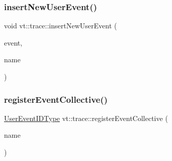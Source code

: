 \mbox{\label{namespacevt_1_1trace_ad8215db5be893bda922be84a8bc586e2}} 
\subsubsection{\texorpdfstring{insert\+New\+User\+Event()}{insertNewUserEvent()}\hspace{0.1cm}{\footnotesize\ttfamily [2/2]}}
{\footnotesize\ttfamily void vt\+::trace\+::insert\+New\+User\+Event (\begin{DoxyParamCaption}\item[{\mbox{[}\mbox{[}maybe\+\_\+unused\mbox{]} \mbox{]} \hyperlink{namespacevt_1_1trace_a5908920d051c144c89f17c69ed262350}{User\+Event\+I\+D\+Type}}]{event,  }\item[{\mbox{[}\mbox{[}maybe\+\_\+unused\mbox{]} \mbox{]} std\+::string const \&}]{name }\end{DoxyParamCaption})}

\mbox{\label{namespacevt_1_1trace_ac5d9cb0fb4e3151a7d613bac126c2143}} 
\subsubsection{\texorpdfstring{register\+Event\+Collective()}{registerEventCollective()}\hspace{0.1cm}{\footnotesize\ttfamily [1/2]}}
{\footnotesize\ttfamily \hyperlink{namespacevt_1_1trace_a5908920d051c144c89f17c69ed262350}{User\+Event\+I\+D\+Type} vt\+::trace\+::register\+Event\+Collective (\begin{DoxyParamCaption}\item[{\mbox{[}\mbox{[}maybe\+\_\+unused\mbox{]} \mbox{]} std\+::string const \&}]{name }\end{DoxyParamCaption})}

\mbox{\label{namespacevt_1_1trace_a91e24c3e4f4145f8178050065befeda6}} 
